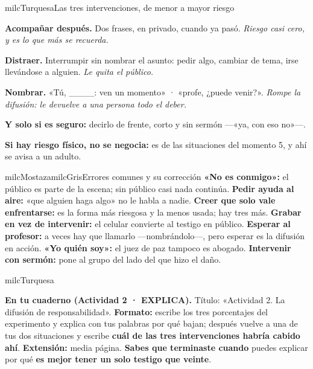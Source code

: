 \documentclass[11pt,letterpaper]{article}
\begin{document}
\begin{drawbox}{milcTurquesa}{Las tres intervenciones, de menor a mayor riesgo}
\begin{pasoslista}
\item \textbf{Acompañar después.} Dos frases, en privado, cuando ya pasó. \emph{Riesgo casi cero, y es lo que más se recuerda.}
\item \textbf{Distraer.} Interrumpir sin nombrar el asunto: pedir algo, cambiar de tema, irse llevándose a alguien. \emph{Le quita el público.}
\item \textbf{Nombrar.} «Tú, \_\_\_\_: ven un momento» · «profe, ¿puede venir?». \emph{Rompe la difusión: le devuelve a una persona todo el deber.}
\item \textbf{Y solo si es seguro:} decirlo de frente, corto y sin sermón ---«ya, con eso no»---.
\item \textbf{Si hay riesgo físico, no se negocia:} es de las situaciones del momento 5, y ahí se avisa a un adulto.
\end{pasoslista}
\end{drawbox}

\begin{softbox}{milcMostaza}{milcGris}{Errores comunes y su corrección}
\textbf{«No es conmigo»:} el público es parte de la escena; sin público casi nada continúa. \textbf{Pedir ayuda al aire:} «que alguien haga algo» no le habla a nadie. \textbf{Creer que solo vale enfrentarse:} es la forma más riesgosa y la menos usada; hay tres más. \textbf{Grabar en vez de intervenir:} el celular convierte al testigo en público. \textbf{Esperar al profesor:} a veces hay que llamarlo ---nombrándolo---, pero esperar es la difusión en acción. \textbf{«Yo quién soy»:} el juez de paz tampoco es abogado. \textbf{Intervenir con sermón:} pone al grupo del lado del que hizo el daño.
\end{softbox}

\begin{infoband}{milcTurquesa}


\textbf{En tu cuaderno (Actividad 2 · EXPLICA).} Título: «Actividad 2. La difusión de responsabilidad». \textbf{Formato:} escribe los tres porcentajes del experimento y explica con tus palabras por qué bajan; después vuelve a una de tus dos situaciones y escribe \textbf{cuál de las tres intervenciones habría cabido ahí}. \textbf{Extensión:} media página. \textbf{Sabes que terminaste cuando} puedes explicar por qué \textbf{es mejor tener un solo testigo que veinte}.
\end{infoband}
\end{document}
